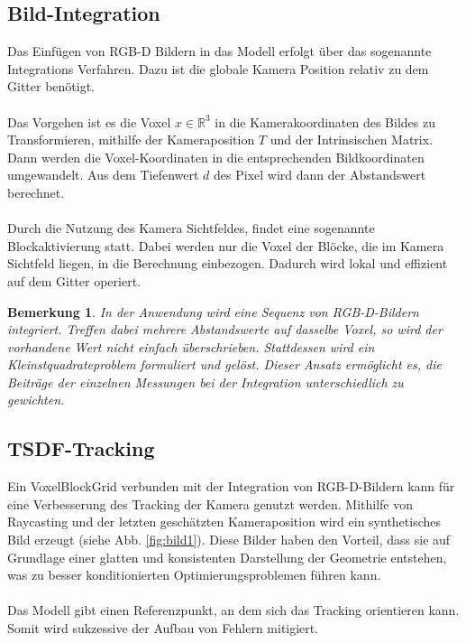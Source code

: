 \documentclass[12pt,DIV=15,BCOR=15mm,twoside,headsepline,abstract=true,listof=totoc,bibliography=totoc]{scrreprt}
\newtheorem{remark}{Bemerkung}[chapter]
\theoremstyle{remark}    %
\begin{document}
    \subsection{Bild-Integration}
    \label{sec:integration}
    Das Einfügen von \ac{RGB-D} Bildern in das Modell erfolgt über das sogenannte Integrations Verfahren. Dazu ist die globale Kamera Position relativ zu dem 
    Gitter benötigt.\\\\
    Das Vorgehen ist es die Voxel $x\in \mathbb{R}^3$ in die Kamerakoordinaten des Bildes zu Transformieren, mithilfe der Kameraposition $T$ 
    und der Intrinsischen Matrix. Dann werden die Voxel-Koordinaten in die entsprechenden Bildkoordinaten umgewandelt. Aus dem Tiefenwert $d$ des Pixel wird 
    dann der Abstandswert berechnet. \\\\
    Durch die Nutzung des Kamera Sichtfeldes, findet eine sogenannte Blockaktivierung statt. Dabei werden nur die Voxel der Blöcke, die im Kamera Sichtfeld liegen,
    in die Berechnung einbezogen. Dadurch wird lokal und effizient auf dem Gitter operiert.
    \begin{remark} \label{bem:weight_integration}
    In der Anwendung wird eine Sequenz von \ac{RGB-D}-Bildern integriert. Treffen dabei mehrere Abstandswerte auf dasselbe Voxel, so wird der vorhandene Wert 
    nicht einfach überschrieben. Stattdessen wird ein Kleinstquadrateproblem formuliert und gelöst. Dieser Ansatz ermöglicht es, die Beiträge der 
    einzelnen Messungen bei der Integration unterschiedlich zu gewichten. 
    \end{remark}

    \subsection{TSDF-Tracking}
    Ein VoxelBlockGrid verbunden mit der Integration von \ac{RGB-D}-Bildern kann für eine Verbesserung des Tracking der Kamera genutzt werden. Mithilfe 
    von Raycasting und der letzten geschätzten Kameraposition wird ein synthetisches Bild erzeugt (siehe Abb. \ref{fig:bild1}). Diese Bilder haben den Vorteil, dass sie auf Grundlage einer glatten
    und konsistenten Darstellung der Geometrie entstehen, was zu besser konditionierten Optimierungsproblemen führen kann.\\\\
    Das Modell gibt einen Referenzpunkt, an dem sich das Tracking orientieren kann. Somit wird sukzessive der Aufbau von Fehlern mitigiert.
\end{document}

